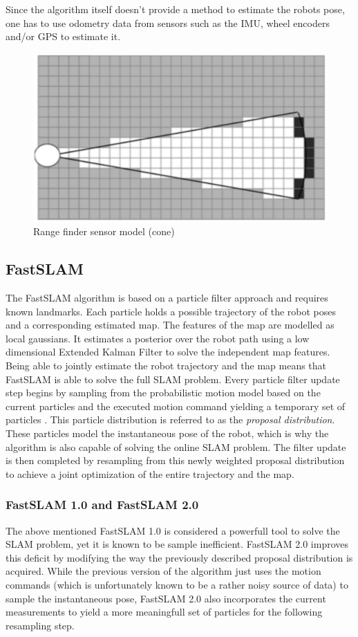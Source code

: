 \documentclass[10pt,journal,compsoc]{IEEEtran}
\begin{document}
Since the algorithm itself doesn't provide a method to estimate the robots pose, one has to use odometry data from sensors such as the IMU, wheel encoders and/or GPS to estimate it.

\begin{figure}[thpb]
      \centering
      \includegraphics[width=0.4\linewidth]{img/occupancy_grid_sensor_model.png}
      \caption{Range finder sensor model (cone)}
      \label{fig:occupancy_grid_sensor_model}
\end{figure}

\subsection{FastSLAM}

The FastSLAM algorithm is based on a particle filter approach and requires known landmarks. Each particle holds a possible trajectory of the robot poses and a corresponding estimated map. The features of the map are modelled as local gaussians. 
It estimates a posterior over the robot path using a low dimensional Extended Kalman Filter to solve the independent map features. Being able to jointly estimate the robot trajectory and the map means that FastSLAM is able to solve the full SLAM problem. Every particle filter update step begins by sampling from the probabilistic motion model based on the current particles and the executed motion command yielding a temporary set of particles \cite{montemerlo_fastslam}. This particle distribution is referred to as the \textit{proposal distribution}. These particles model the instantaneous pose of the robot, which is why the algorithm is also capable of solving the online SLAM problem. The filter update is then completed by resampling from this newly weighted proposal distribution to achieve a joint optimization of the entire trajectory and the map.

\subsubsection{FastSLAM 1.0 and FastSLAM 2.0}
The above mentioned FastSLAM 1.0 is considered a powerfull tool to solve the SLAM problem, yet it is known to be sample inefficient. FastSLAM 2.0\cite{montemerlo_fastslam_2_0} improves this deficit by modifying the way the previously described proposal distribution is acquired. While the previous version of the algorithm just uses the motion commands (which is unfortunately known to be a rather noisy source of data) to sample the instantaneous pose, FastSLAM 2.0 also incorporates the current measurements to yield a more meaningfull set of particles for the following resampling step.
\end{document}
